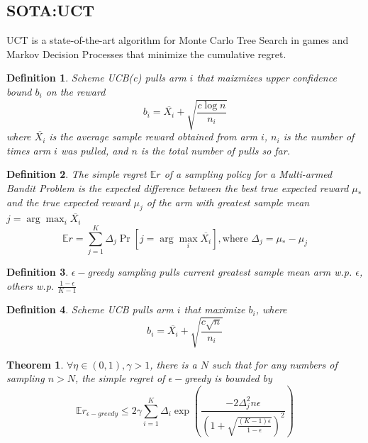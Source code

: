 \documentclass[11pt]{article}
\theoremstyle{definitionstyle}
\newtheorem{defn}{Definition}
\newtheorem{thm}{Theorem}
\newenvironment{framedminipage}
    {\begin{framed}\begin{minipage}{0.9\textwidth}}
    {\end{minipage}\end{framed}}
\begin{document}
\subsection{SOTA:UCT}
UCT is a state-of-the-art algorithm for Monte Carlo Tree Search in games and Markov Decision Processes that minimize the cumulative regret.\\
\begin{framedminipage}
\begin{defn}
Scheme UCB(c) pulls arm $i$ that maixmizes upper confidence bound $b_i$ on the reward
\[
    b_i=\overline{X_i}+\sqrt{\frac{c\log n}{n_i}}
\]
where \( \overline{X_i} \) is the average sample reward obtained from arm \( i \), \( n_i \) is the number of times arm \( i \) was pulled, and \( n \) is the total number of pulls so far.
\end{defn}
\begin{defn}
The simple regret $\mathbb{E}r$ of a sampling policy for a Multi-armed Bandit Problem is the expected difference between the best true expected reward $\mu_*$ and the true expected reward $\mu_j$ of the arm with greatest sample mean $j=\arg\max_i\overline{X_i}$
\[
    \mathbb{E}r=\sum_{j=1}^K\Delta_j\Pr[j=\arg\max_i\overline{X_i}],\text{where }\Delta_j=\mu_*-\mu_j
\]
\end{defn}
\begin{defn}
$\epsilon-$greedy sampling pulls current greatest sample mean arm w.p. $\epsilon$, others w.p. $\frac{1-\epsilon}{K-1}$
\end{defn}
\begin{defn}
Scheme UCB pulls arm $i$ that maximize $b_i$, where 
\[
    b_i=\overline{X_i}+\sqrt{\frac{c\sqrt{n}}{n_i}}
\]
\end{defn}
\end{framedminipage}
\begin{thm}
$\forall\eta\in(0,1),\gamma>1$, there is a $N$ such that for any numbers of sampling $n>N$, the simple regret of $\epsilon-$greedy is bounded by
\[
    \mathbb{E}r_{\epsilon-greedy}\le2\gamma\sum_{i=1}^K\Delta_i\exp\left(\frac{-2\Delta_j^2n\epsilon}{\left(1+\sqrt{\frac{(K-1)\epsilon}{1-\epsilon}}\right)^2}\right)
\]
\end{thm}
\end{document}
